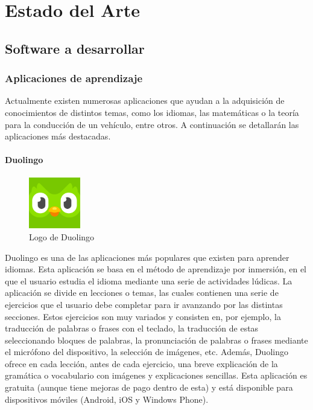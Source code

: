     \chapter{Estado del Arte}
    \section{Software a desarrollar}
    \subsection{Aplicaciones de aprendizaje}
    Actualmente existen numerosas aplicaciones que ayudan a la adquisición de conocimientos de distintos temas, 
    como los idiomas, las matemáticas o la teoría para la conducción de un vehículo, entre otros. A continuación se
    detallarán las aplicaciones más destacadas.
   
    \subsubsection{Duolingo}
    \begin{figure}
        \vspace*{-0.4cm}

        \centering
        \includegraphics[width=0.2\textwidth]{imagenes/c2/duolingo.png}
        \caption{Logo de Duolingo}
        \vspace*{-0.15cm}
    \end{figure}

    Duolingo es una de las aplicaciones más populares que existen para aprender idiomas. Esta aplicación se basa en el método
    de aprendizaje por inmersión, en el que el usuario estudia el idioma mediante una serie de actividades lúdicas.
    La aplicación se divide en lecciones o temas, las cuales contienen una serie de ejercicios que el usuario debe
    completar para ir avanzando por las distintas secciones. Estos ejercicios son muy variados y consisten en, por ejemplo,
    la traducción de palabras o frases con el teclado, la traducción de estas seleccionando bloques de palabras, la
    pronunciación de palabras o frases mediante el micrófono del dispositivo, la selección de imágenes, etc. Además,
    Duolingo ofrece en cada lección, antes de cada ejercicio, una breve explicación de la gramática o vocabulario con
    imágenes y explicaciones sencillas. Esta aplicación es gratuita (aunque tiene mejoras de pago dentro de esta) 
    y está disponible para dispositivos móviles (Android, iOS y Windows Phone).
 
